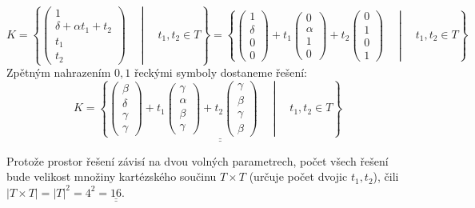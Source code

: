 \documentclass[12pt]{article}
\begin{document}
\begin{enumerate}
    \[
    K = \left\{ 
        \left(\begin{array}{c} 1 \\ \delta + \alpha t_1 + t_2 \\ t_1 \\ t_2 \end{array}\right) 
        \quad \middle| \quad t_1,t_2 \in T
      \right\} = 
      \left\{ 
        \left(\begin{array}{c} 1 \\ \delta \\ 0 \\ 0 \end{array}\right) +
        t_1\left(\begin{array}{c} 0 \\ \alpha \\ 1 \\ 0 \end{array}\right) +
        t_2\left(\begin{array}{c} 0 \\ 1 \\ 0 \\ 1 \end{array}\right)
        \quad \middle| \quad t_1,t_2 \in T
      \right\}
    \]
    Zpětným nahrazením $0,1$ řeckými symboly dostaneme řešení:
    \[
    K = \underline{\underline{\left\{ 
        \left(\begin{array}{c} \beta \\ \delta \\ \gamma \\ \gamma \end{array}\right) +
        t_1\left(\begin{array}{c} \gamma \\ \alpha \\ \beta \\ \gamma \end{array}\right) +
        t_2\left(\begin{array}{c} \gamma \\ \beta \\ \gamma \\ \beta \end{array}\right)
        \quad \middle| \quad t_1,t_2 \in T
      \right\}}}
    \]

    Protože prostor řešení závisí na dvou volných parametrech, počet všech řešení bude velikost množiny kartézského součinu $T \times T$ (určuje počet dvojic $t_1,t_2$),
    čili $|T \times T| = |T|^2 = 4^2 = \underline{\underline{16}}$.

\end{enumerate}
\end{document}
